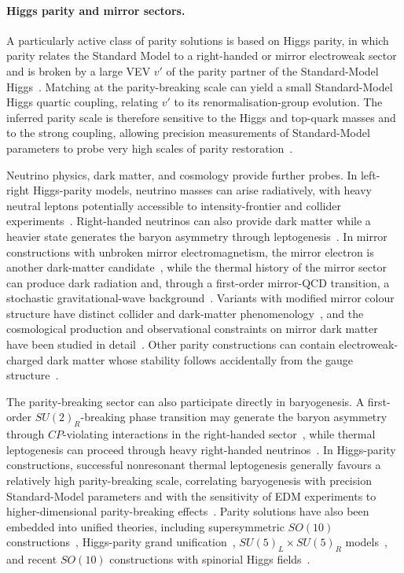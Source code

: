\documentclass[review]{elsarticle}
\numberwithin{equation}{section}
\numberwithin{table}{section}
\numberwithin{figure}{section}
\begin{document}
\paragraph{Higgs parity and mirror sectors.}

A particularly active class of parity solutions is based on Higgs parity, in which parity relates the Standard Model to a right-handed or mirror electroweak sector and is broken by a large VEV $v'$ of the parity partner of the Standard-Model Higgs~\cite{Hall:2018let,Dunsky:2019api}. Matching at the parity-breaking scale can yield a small Standard-Model Higgs quartic coupling, relating $v'$ to its renormalisation-group evolution. The inferred parity scale is therefore sensitive to the Higgs and top-quark masses and to the strong coupling, allowing precision measurements of Standard-Model parameters to probe very high scales of parity restoration~\cite{Hall:2018let,Dunsky:2019api,Carrasco-Martinez:2023nit}.

Neutrino physics, dark matter, and cosmology provide further probes. In left-right Higgs-parity models, neutrino masses can arise radiatively, with heavy neutral leptons potentially accessible to intensity-frontier and collider experiments~\cite{Hall:2023vjb}. Right-handed neutrinos can also provide dark matter while a heavier state generates the baryon asymmetry through leptogenesis~\cite{Dunsky:2020dhn}. In mirror constructions with unbroken mirror electromagnetism, the mirror electron is another dark-matter candidate~\cite{Dunsky:2019api}, while the thermal history of the mirror sector can produce dark radiation and, through a first-order mirror-QCD transition, a stochastic gravitational-wave background~\cite{Dunsky:2019upk}. Variants with modified mirror colour structure have distinct collider and dark-matter phenomenology~\cite{Bonnefoy:2023afx}, and the cosmological production and observational constraints on mirror dark matter have been studied in detail~\cite{Bonnefoy:2023yoj,Redi:2023kgu}. Other parity constructions can contain electroweak-charged dark matter whose stability follows accidentally from the gauge structure~\cite{Baldwin:2026mwv}.

The parity-breaking sector can also participate directly in baryogenesis. A first-order $SU(2)_R$-breaking phase transition may generate the baryon asymmetry through $CP$-violating interactions in the right-handed sector~\cite{Harigaya:2022wzt}, while thermal leptogenesis can proceed through heavy right-handed neutrinos~\cite{Carrasco-Martinez:2023nit}. In Higgs-parity constructions, successful nonresonant thermal leptogenesis generally favours a relatively high parity-breaking scale, correlating baryogenesis with precision Standard-Model parameters and with the sensitivity of EDM experiments to higher-dimensional parity-breaking effects~\cite{Carrasco-Martinez:2023nit}. Parity solutions have also been embedded into unified theories, including supersymmetric $SO(10)$ constructions~\cite{Mimura:2019yfi}, Higgs-parity grand unification~\cite{Hall:2019qwx}, $SU(5)_L\times SU(5)_R$ models~\cite{Babu:2023dzz}, and recent $SO(10)$ constructions with spinorial Higgs fields~\cite{Carrasco-Martinez:2025zus}.
\end{document}
